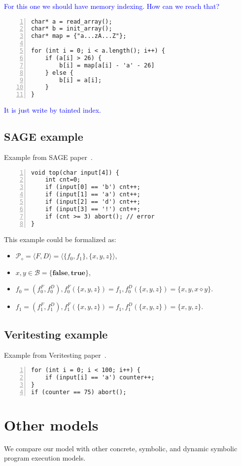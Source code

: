 \documentclass[fleqn,oneside,a4]{article}
\newcommand{\level}{\section}
\newcommand{\sublevel}{\subsection}
\newcommand{\comment}[1]{\textcolor{blue}{#1}}  %
\newcommand{\true}{\textbf{true}}
\newcommand{\false}{\textbf{false}}
\begin{document}
\comment{For this one we should have memory indexing.
How can we reach that?}

\begin{lstlisting}[numbers=left,numberstyle=\scriptsize]
char* a = read_array();
char* b = init_array();
char* map = {"a...zA...Z"};

for (int i = 0; i < a.length(); i++) {
    if (a[i] > 26) {
        b[i] = map[a[i] - 'a' - 26]
    } else {
        b[i] = a[i];
    }
}
\end{lstlisting}

\comment{It is just write by tainted index.}

\sublevel{SAGE example}

Example from SAGE paper~\cite{sage}.
\begin{lstlisting}[numbers=left,numberstyle=\scriptsize]
void top(char input[4]) {
    int cnt=0;
    if (input[0] == 'b') cnt++;
    if (input[1] == 'a') cnt++;
    if (input[2] == 'd') cnt++;
    if (input[3] == '!') cnt++;
    if (cnt >= 3) abort(); // error
}
\end{lstlisting}

This example could be formalized as:
\begin{itemize}
    \item $\mathcal{P}_{\diamond} = \langle F, D \rangle =
        \langle \{f_0, f_1\}, \{x, y, z\} \rangle$,
    \item $x, y \in \mathcal{B} = \{\false, \true\}$,
    \item $f_0 = (f^F_0, f^D_0), f^F_0(\{x, y, z\}) = f_1,
        f^D_0(\{x, y, z\}) = \{x, y, x \diamond y\}$.
    \item $f_1 = (f^F_1, f^D_1), f^F_1(\{x, y, z\}) = f_1,
        f^D_1(\{x, y, z\}) = \{x, y, z\}$.
\end{itemize}

\sublevel{Veritesting example}

Example from Veritesting paper~\cite{veritesting}.
\begin{lstlisting}[numbers=left,numberstyle=\scriptsize]
for (int i = 0; i < 100; i++) {
    if (input[i] == 'a') counter++;
}
if (counter == 75) abort();
\end{lstlisting}

\level{Other models}

We compare our model with other concrete, symbolic, and dynamic symbolic
program execution models.
\end{document}

